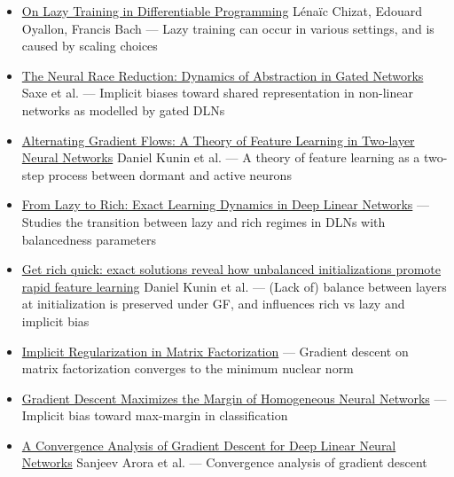 \documentclass[11pt]{article}
\begin{document}
\begin{itemize}
  \item \href{https://arxiv.org/abs/1812.07956}{On Lazy Training in Differentiable Programming} Lénaïc Chizat, Edouard Oyallon, Francis Bach --- Lazy training can occur in various settings, and is caused by scaling choices
  \item \href{https://arxiv.org/abs/2207.10430}{The Neural Race Reduction: Dynamics of Abstraction in Gated Networks} Saxe et al. --- Implicit biases toward shared representation in non-linear networks as modelled by gated DLNs
  \item \href{https://arxiv.org/abs/2506.06489}{Alternating Gradient Flows: A Theory of Feature Learning in Two-layer Neural Networks} Daniel Kunin et al. --- A theory of feature learning as a two-step process between dormant and active neurons
  \item \href{https://arxiv.org/abs/2409.14623}{From Lazy to Rich: Exact Learning Dynamics in Deep Linear Networks} --- Studies the transition between lazy and rich regimes in DLNs with balancedness parameters
  \item \href{https://arxiv.org/abs/2406.06158}{Get rich quick: exact solutions reveal how unbalanced initializations promote rapid feature learning} Daniel Kunin et al. --- (Lack of) balance between layers at initialization is preserved under GF, and influences rich vs lazy and implicit bias
  \item \href{https://arxiv.org/abs/1705.09280}{Implicit Regularization in Matrix Factorization} --- Gradient descent on matrix factorization converges to the minimum nuclear norm
  \item \href{https://arxiv.org/abs/1906.05890}{Gradient Descent Maximizes the Margin of Homogeneous Neural Networks} --- Implicit bias toward max-margin in classification
  \item \href{https://arxiv.org/abs/1810.02281}{A Convergence Analysis of Gradient Descent for Deep Linear Neural Networks} Sanjeev Arora et al. --- Convergence analysis of gradient descent
\end{itemize}
\end{document}
